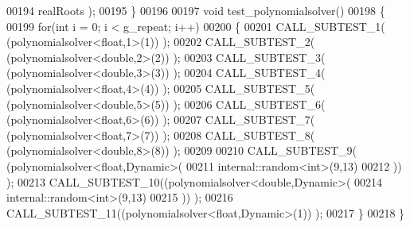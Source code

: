 \begin{DoxyCode}
00194       realRoots );
00195 \}
00196 
00197 \textcolor{keywordtype}{void} test\_polynomialsolver()
00198 \{
00199   \textcolor{keywordflow}{for}(\textcolor{keywordtype}{int} i = 0; i < g\_repeat; i++)
00200   \{
00201     CALL\_SUBTEST\_1( (polynomialsolver<float,1>(1)) );
00202     CALL\_SUBTEST\_2( (polynomialsolver<double,2>(2)) );
00203     CALL\_SUBTEST\_3( (polynomialsolver<double,3>(3)) );
00204     CALL\_SUBTEST\_4( (polynomialsolver<float,4>(4)) );
00205     CALL\_SUBTEST\_5( (polynomialsolver<double,5>(5)) );
00206     CALL\_SUBTEST\_6( (polynomialsolver<float,6>(6)) );
00207     CALL\_SUBTEST\_7( (polynomialsolver<float,7>(7)) );
00208     CALL\_SUBTEST\_8( (polynomialsolver<double,8>(8)) );
00209 
00210     CALL\_SUBTEST\_9( (polynomialsolver<float,Dynamic>(
00211             internal::random<int>(9,13)
00212             )) );
00213     CALL\_SUBTEST\_10((polynomialsolver<double,Dynamic>(
00214             internal::random<int>(9,13)
00215             )) );
00216     CALL\_SUBTEST\_11((polynomialsolver<float,Dynamic>(1)) );
00217   \}
00218 \}
\end{DoxyCode}
